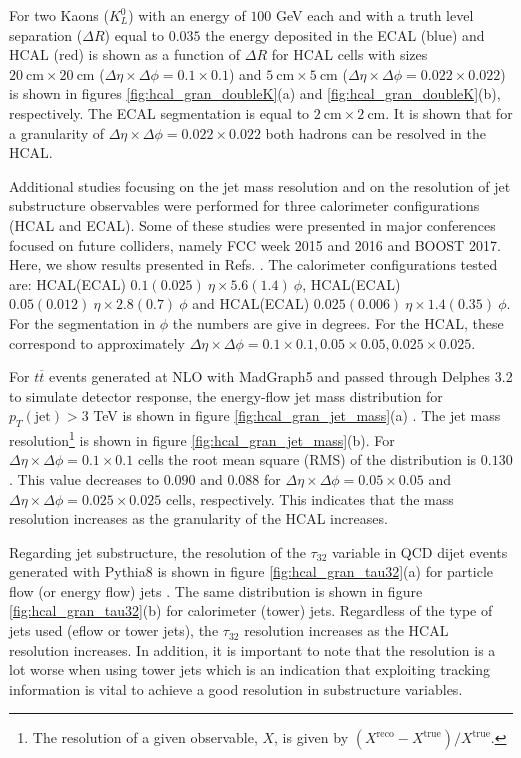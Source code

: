 For two Kaons ($K_L^0$) with an energy of $100$ GeV each and with a truth level separation ($\Delta R$) equal to $0.035$ the energy deposited in the ECAL (blue) and HCAL (red) is shown as a function of $\Delta R$ for HCAL cells with sizes $20~\text{cm}\times 20~\text{cm}$ ($\Delta \eta\times \Delta\phi=0.1\times 0.1$) and $5~\text{cm}\times 5~\text{cm}$ ($\Delta \eta\times \Delta\phi=0.022\times 0.022$) is shown in figures \ref{fig:hcal_gran_doubleK}(a) and \ref{fig:hcal_gran_doubleK}(b), respectively. The ECAL segmentation is equal to $2~\text{cm}\times 2~\text{cm}$. It is shown that for a granularity of $\Delta \eta\times \Delta\phi=0.022\times 0.022$ both hadrons can be resolved in the HCAL.

Additional studies focusing on the jet mass resolution and on the resolution of jet substructure observables were performed for three calorimeter configurations (HCAL and ECAL). Some of these studies were presented in major conferences focused on future colliders, namely FCC week 2015 and 2016 and BOOST 2017. Here, we show results presented in Refs. \cite{FCCweek2015,FCCweek2016,BOOST2017}. The calorimeter configurations tested are: HCAL(ECAL) $0.1(0.025)~\eta \times 5.6(1.4)~\phi$, HCAL(ECAL) $0.05(0.012)~\eta \times 2.8(0.7)~\phi$ and HCAL(ECAL) $0.025(0.006)~\eta \times 1.4(0.35)~\phi$. For the segmentation in $\phi$ the numbers are give in degrees. For the HCAL, these correspond to approximately $\Delta\eta\times\Delta\phi=0.1\times0.1,0.05\times 0.05, 0.025\times0.025$. 

For $t\overline{t}$ events generated at NLO with MadGraph5 and passed through Delphes 3.2 to simulate detector response, the energy-flow jet mass distribution for $p_T(\text{jet})>3$ TeV is shown in figure \ref{fig:hcal_gran_jet_mass}(a) \cite{FCCweek2015}. The jet mass resolution\footnote{The resolution of a given observable, $X$, is given by $(X^{\text{reco}}-X^{\text{true}})/X^{\text{true}}$.} is shown in figure \ref{fig:hcal_gran_jet_mass}(b). For $\Delta\eta\times\Delta\phi=0.1\times0.1$ cells the root mean square (RMS) of the distribution is $0.130$. This value decreases to $0.090$ and $0.088$ for $\Delta\eta\times\Delta\phi=0.05\times0.05$ and $\Delta\eta\times\Delta\phi=0.025\times0.025$ cells, respectively. This indicates that the mass resolution increases as the granularity of the HCAL increases.

Regarding jet substructure, the resolution of the $\tau_{32}$ variable in QCD dijet events generated with Pythia8 is shown in figure \ref{fig:hcal_gran_tau32}(a) for particle flow (or energy flow) jets \cite{FCCweek2015}. The same distribution is shown in figure \ref{fig:hcal_gran_tau32}(b) for calorimeter (tower) jets. Regardless of the type of jets used (eflow or tower jets), the $\tau_{32}$ resolution increases as the HCAL resolution increases. In addition, it is important to note that the resolution is a lot worse when using tower jets which is an indication that exploiting tracking information is vital to achieve a good resolution in substructure variables. 

